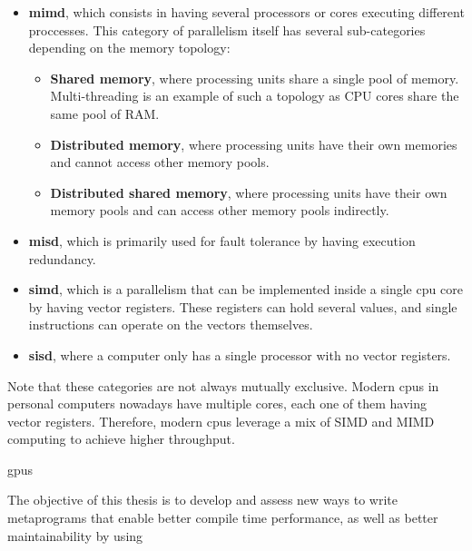 \documentclass[main]{subfiles}
\begin{document}
\begin{itemize}
\item
\textbf{\gls{mimd}}, which consists in having several processors or cores
executing different proccesses. This category of parallelism itself has several
sub-categories depending on the memory topology:

  \begin{itemize}
  \item \textbf{Shared memory}, where processing units share a single
  pool of memory. Multi-threading is an example of such a topology as
  CPU cores share the same pool of RAM.
  \item \textbf{Distributed memory}, where processing units have their own
  memories and cannot access other memory pools.
  \item \textbf{Distributed shared memory}, where processing units have their
  own memory pools and can access other memory pools indirectly.
  \end{itemize}

\item
\textbf{\gls{misd}}, which is primarily used for fault tolerance by having
execution redundancy.

\item
\textbf{\gls{simd}}, which is a parallelism that can be implemented inside
a single \gls{cpu} core by having vector registers. These registers can hold
several values, and single instructions can operate on the vectors themselves.

\item
\textbf{\gls{sisd}}, where a computer only has a single processor with no
vector registers.

\end{itemize}

Note that these categories are not always mutually exclusive.
Modern \glspl{cpu} in personal computers nowadays have multiple cores,
each one of them having vector registers. Therefore, modern \glspl{cpu}
leverage a mix of SIMD and MIMD computing to achieve higher throughput.

\glspl{gpu}





The objective of this thesis is to develop and assess new ways to write
\cpp metaprograms that enable better compile time performance, as well as
better maintainability by using


\end{document}
